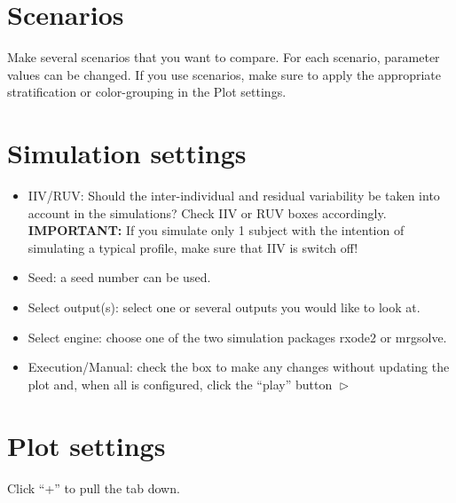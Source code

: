 \documentclass[
]{book}
\providecommand{\tightlist}{%
  \setlength{\itemsep}{0pt}\setlength{\parskip}{0pt}}
\begin{document}
\section{Scenarios}\label{scenarios}

Make several scenarios that you want to compare. For each scenario, parameter values can be changed. If you use scenarios, make sure to apply the appropriate stratification or color-grouping in the Plot settings.

\section{Simulation settings}\label{simulation-settings}

\begin{itemize}
\tightlist
\item
  IIV/RUV: Should the inter-individual and residual variability be taken into account in the simulations? Check IIV or RUV boxes accordingly. \textbf{IMPORTANT:} If you simulate only 1 subject with the intention of simulating a typical profile, make sure that IIV is switch off!
\item
  Seed: a seed number can be used.
\item
  Select output(s): select one or several outputs you would like to look at.
\item
  Select engine: choose one of the two simulation packages rxode2 or mrgsolve.
\item
  Execution/Manual: check the box to make any changes without updating the plot and, when all is configured, click the ``play'' button \(\vartriangleright\)
\end{itemize}

\section{Plot settings}\label{plot-settings}

Click ``+'' to pull the tab down.
\end{document}
